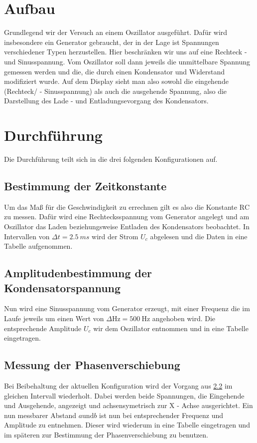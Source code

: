 \section{Aufbau}
Grundlegend wir der Versuch an einem Oszillator ausgeführt.
Dafür wird insbesondere ein Generator gebraucht, der in der Lage ist Spannungen verschiedener Typen herzustellen. Hier beschränken wir uns auf eine Rechteck - und Sinusspannung. Vom Oszillator soll dann jeweils die unmittelbare Spannung gemessen werden und die, die durch einen Kondensator und Widerstand modifiziert wurde. Auf dem Display sieht man also sowohl die eingehende (Rechteck/ - Sinusspannung) als auch die ausgehende Spannung, also die Darstellung des Lade - und Entladungsevorgang des Kondensators.

\section{Durchführung}
Die Durchführung teilt sich in die  drei folgenden Konfigurationen auf.
\subsection{Bestimmung der Zeitkonstante}
Um das Maß für die Geschwindigkeit zu errechnen gilt es also die Konstante $\text{RC}$ zu messen.
Dafür wird eine Rechtecksspannung vom Generator angelegt und am Oszillator das Laden beziehungsweise Entladen des Kondensators beobachtet. In Intervallen von $\Delta t = \SI{2.5}{ms}$ wird der Strom $U_c$ abgelesen und die Daten in eine Tabelle aufgenommen. %
\subsection{Amplitudenbestimmung der Kondensatorspannung}
\label{sectionref}
Nun wird eine Sinusspannung vom Generator erzeugt, mit einer Frequenz die im Laufe jeweils um einen Wert von $\Delta\si{\hertz}= \SI{500}{\hertz}$ angehoben wird. Die entsprechende Amplitude $U_c$ wir dem Oszillator entnommen und in eine Tabelle eingetragen.
\subsection{Messung der Phasenverschiebung}
Bei Beibehaltung der aktuellen Konfiguration wird der Vorgang aus \ref{sectionref} im gleichen Intervall wiederholt. Dabei werden beide Spannungen, die Eingehende und Ausgehende, angezeigt und achsensymetrisch zur X - Achse ausgerichtet.
Ein nun messbarer Abstand $a \text{und} b$ %
ist nun bei entsprechender Frequenz und Amplitude zu entnehmen. Dieser wird wiederum in eine Tabelle 
eingetragen und im späteren zur Bestimmung der Phasenverschiebung zu benutzen.


